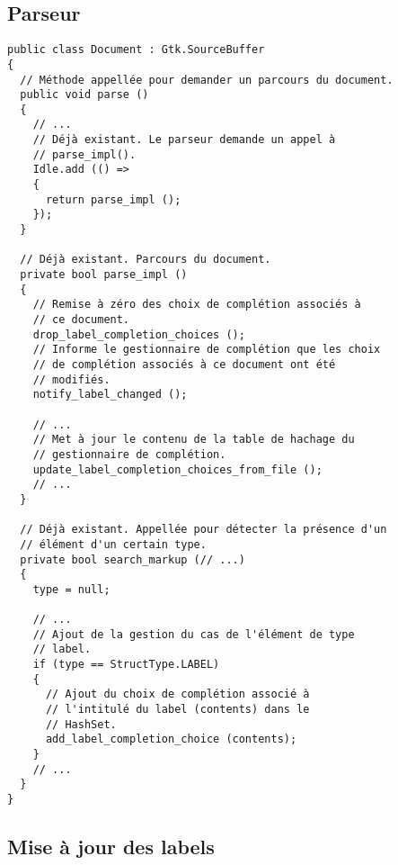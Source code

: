 \documentclass[a4paper,11pt]{report}
\begin{document}
\subsection{Parseur}
\label{ssec:parseur}

\begin{lstlisting}[frame=single]
public class Document : Gtk.SourceBuffer
{
  // Méthode appellée pour demander un parcours du document.
  public void parse ()
  {
    // ...
    // Déjà existant. Le parseur demande un appel à
    // parse_impl().
    Idle.add (() =>
    {
      return parse_impl ();
    });
  }
  
  // Déjà existant. Parcours du document.
  private bool parse_impl ()
  {
    // Remise à zéro des choix de complétion associés à
    // ce document.
    drop_label_completion_choices ();
    // Informe le gestionnaire de complétion que les choix
    // de complétion associés à ce document ont été
    // modifiés.
    notify_label_changed ();
    
    // ...
    // Met à jour le contenu de la table de hachage du
    // gestionnaire de complétion.
    update_label_completion_choices_from_file ();
    // ...
  }
  
  // Déjà existant. Appellée pour détecter la présence d'un
  // élément d'un certain type.
  private bool search_markup (// ...)
  {
    type = null;
    
    // ...
    // Ajout de la gestion du cas de l'élément de type
    // label.
    if (type == StructType.LABEL)
    {
      // Ajout du choix de complétion associé à
      // l'intitulé du label (contents) dans le
      // HashSet.
      add_label_completion_choice (contents);
    }
    // ...
  }
}
\end{lstlisting}

\subsection{Mise à jour des labels}
\label{ssec:maj_des_labels}
\end{document}
